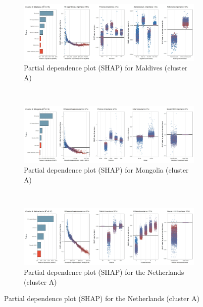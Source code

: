 \begin{figure}[ht!]\ContinuedFloat
    \centering
   \begin{subfigure}[b]{\textwidth}
    \centering
         \caption{Partial dependence plot (SHAP) for Maldives (cluster A)}
         \label{fig:5b_MDV}
         \includegraphics[width=\textwidth]{Figure 5b/Figure_5b_MDV}     
     \end{subfigure}
    \\
    \vspace{0.5cm}
   \begin{subfigure}[b]{\textwidth}
    \centering
         \caption{Partial dependence plot (SHAP) for Mongolia (cluster A)}
         \label{fig:5b_MNG}
         \includegraphics[width=\textwidth]{Figure 5b/Figure_5b_MNG}     
         \end{subfigure}
    \\
    \vspace{0.5cm}
   \begin{subfigure}[b]{\textwidth}
   \centering
         \caption{Partial dependence plot (SHAP) for the Netherlands (cluster A)}
         \label{fig:5b_NLD}
         \includegraphics[width=\textwidth]{Figure 5b/Figure_5b_NLD}     

\end{subfigure}
\end{figure}
